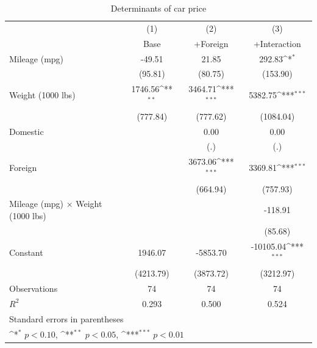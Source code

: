 \begin{table}[htbp]\centering
\def\sym#1{\ifmmode^{#1}\else\(^{#1}\)\fi}
\caption{Determinants of car price\label{tab:price}}
\begin{tabular}{l*{3}{c}}
\toprule
                    &\multicolumn{1}{c}{(1)}&\multicolumn{1}{c}{(2)}&\multicolumn{1}{c}{(3)}\\
                    &\multicolumn{1}{c}{Base}&\multicolumn{1}{c}{+Foreign}&\multicolumn{1}{c}{+Interaction}\\
\midrule
Mileage (mpg)       &      -49.51         &       21.85         &      292.83\sym{*}  \\
                    &     (95.81)         &     (80.75)         &    (153.90)         \\
\addlinespace
Weight (1000 lbs)   &     1746.56\sym{**} &     3464.71\sym{***}&     5382.75\sym{***}\\
                    &    (777.84)         &    (777.62)         &   (1084.04)         \\
\addlinespace
Domestic            &                     &        0.00         &        0.00         \\
                    &                     &         (.)         &         (.)         \\
\addlinespace
Foreign             &                     &     3673.06\sym{***}&     3369.81\sym{***}\\
                    &                     &    (664.94)         &    (757.93)         \\
\addlinespace
Mileage (mpg) $\times$ Weight (1000 lbs)&                     &                     &     -118.91         \\
                    &                     &                     &     (85.68)         \\
\addlinespace
Constant            &     1946.07         &    -5853.70         &   -10105.04\sym{***}\\
                    &   (4213.79)         &   (3873.72)         &   (3212.97)         \\
\midrule
Observations        &          74         &          74         &          74         \\
\(R^{2}\)           &       0.293         &       0.500         &       0.524         \\
\bottomrule
\multicolumn{4}{l}{\footnotesize Standard errors in parentheses}\\
\multicolumn{4}{l}{\footnotesize \sym{*} \(p<0.10\), \sym{**} \(p<0.05\), \sym{***} \(p<0.01\)}\\
\end{tabular}
\end{table}

